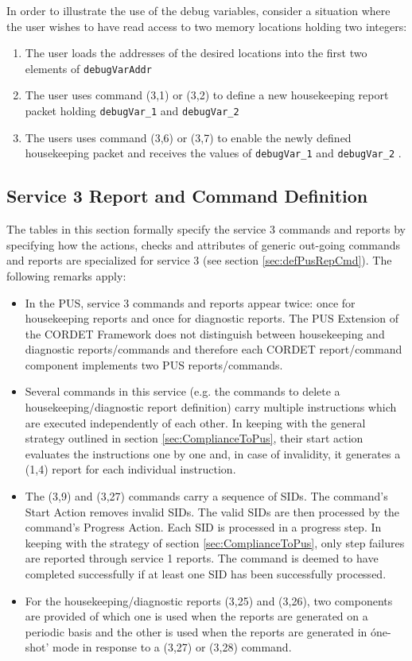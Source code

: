 \documentclass{pnp_article}
\begin{document}
In order to illustrate the use of the debug variables, consider a situation where the user wishes to have read access to two memory locations holding two integers: 

\begin{enumerate}
\item The user loads the addresses of the desired locations into the first two elements of \texttt{debugVarAddr}
\item The user uses command (3,1) or (3,2) to define a new housekeeping report packet holding \texttt{debugVar\_1} and \texttt{debugVar\_2} 
\item The users uses command (3,6) or (3,7) to enable the newly defined housekeeping packet and receives the values of \texttt{debugVar\_1} and \texttt{debugVar\_2} .
\end{enumerate}


\subsection{Service 3 Report and Command Definition}\label{sec:serv3RepCmdDef}
The tables in this section formally specify the service 3 commands and reports by specifying how the actions, checks and attributes of generic out-going commands and reports are specialized for service 3 (see section \ref{sec:defPusRepCmd}). The following remarks apply:

\begin{itemize}
\item In the PUS, service 3 commands and reports appear twice: once for housekeeping reports and once for diagnostic reports. The PUS Extension of the CORDET Framework does not distinguish between housekeeping and diagnostic reports/commands and therefore each CORDET report/command component implements two PUS reports/commands.
\item Several commands in this service (e.g. the commands to delete a housekeeping/diagnostic report definition) carry multiple instructions which are executed independently of each other. In keeping with the general strategy outlined in section \ref{sec:ComplianceToPus}, their start action evaluates the instructions one by one and, in case of invalidity, it generates a (1,4) report for each individual instruction.
\item The (3,9) and (3,27) commands carry a sequence of SIDs. The command's Start Action removes invalid SIDs. The valid SIDs are then processed by the command's Progress Action. Each SID is processed in a progress step. In keeping with the strategy of section \ref{sec:ComplianceToPus}, only step failures are reported through service 1 reports. The command is deemed to have completed successfully if at least one SID has been successfully processed. 
\item For the housekeeping/diagnostic reports (3,25) and (3,26), two components are provided of which one is used when the reports are generated on a periodic basis and the other is used when the reports are generated in óne-shot' mode in response to a (3,27) or (3,28) command.
\end{itemize}
\end{document}
